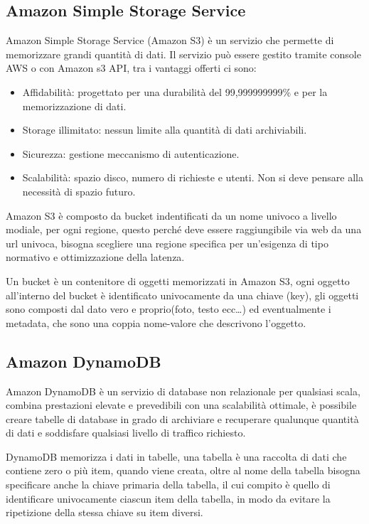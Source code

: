 \subsection{Amazon Simple Storage Service}
Amazon Simple Storage Service (Amazon S3) è un servizio che permette di memorizzare grandi quantità di dati. Il servizio può essere gestito tramite console AWS o con
Amazon s3 API, tra i vantaggi offerti ci sono:
\begin{itemize}
    \item Affidabilità: progettato per una durabilità del 99,999999999\% e per la memorizzazione di dati.
    \item Storage illimitato: nessun limite alla quantità di dati archiviabili.
    \item Sicurezza: gestione meccanismo di autenticazione.
    \item Scalabilità: spazio disco, numero di richieste e utenti. Non si deve pensare alla necessità di spazio futuro. 
\end{itemize}
Amazon S3 è composto da bucket indentificati da un nome univoco a livello modiale, per ogni regione, questo perché deve essere raggiungibile via web da una url univoca,
bisogna scegliere una regione specifica per un'esigenza di tipo normativo e ottimizzazione della latenza.

Un bucket è un contenitore di oggetti memorizzati in Amazon S3, ogni oggetto all'interno del bucket è identificato univocamente da una chiave (key), gli oggetti sono 
composti dal dato vero e proprio(foto, testo ecc\dots) ed eventualmente i metadata, che sono una coppia nome-valore che descrivono l'oggetto.

\subsection{Amazon DynamoDB}
Amazon DynamoDB è un servizio di database non relazionale per qualsiasi scala, combina prestazioni elevate e prevedibili con una scalabilità ottimale, è possibile 
creare tabelle di database in grado di archiviare e recuperare qualunque quantità di dati e soddisfare qualsiasi livello di traffico richiesto.

DynamoDB memorizza i dati in tabelle, una tabella è una raccolta di dati che contiene zero o più item, quando viene creata, oltre al nome della tabella bisogna 
specificare anche la chiave primaria della tabella, il cui compito è quello di identificare univocamente ciascun item della tabella, in modo da evitare la ripetizione
della stessa chiave su item diversi. 

